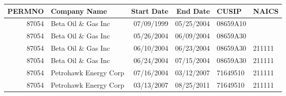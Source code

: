 

\begin{longtable}{ r l r r l l }\hline\hline
   PERMNO &    Company Name &    Start Date &    End Date &    CUSIP &    NAICS\\ 
\hline\endhead
   87054 &    Beta Oil \& Gas Inc &    07/09/1999 &    05/25/2004 &    08659A10 &     \\ 
   87054 &    Beta Oil \& Gas Inc &    05/26/2004 &    06/09/2004 &    08659A30 &     \\ 
   87054 &    Beta Oil \& Gas Inc &    06/10/2004 &    06/23/2004 &    08659A30 &    211111\\ 
   87054 &    Beta Oil \& Gas Inc &    06/24/2004 &    07/15/2004 &    08659A30 &    211111\\ 
   87054 &    Petrohawk Energy Corp &    07/16/2004 &    03/12/2007 &    71649510 &    211111\\ 
   87054 &    Petrohawk Energy Corp &    03/13/2007 &    08/25/2011 &    71649510 &    211111\\ 
\hline\hline\end{longtable}

